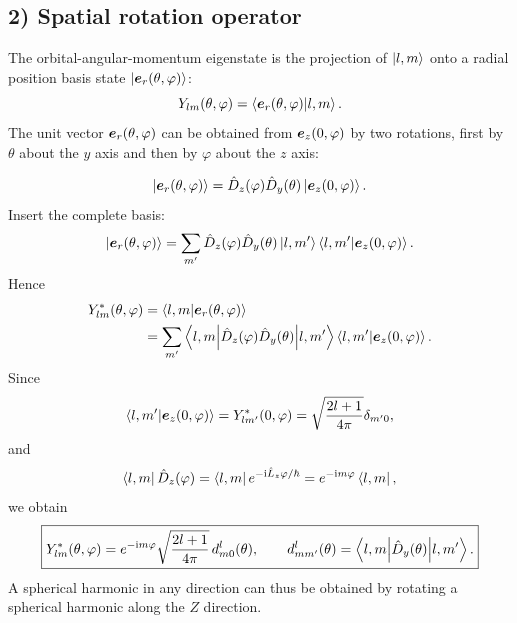 \subsection*{2) Spatial rotation operator}
The orbital-angular-momentum eigenstate is the projection of $\left|l,m\right\rangle$ onto a radial position basis state $\left|\bm{e}_r(\theta,\varphi)\right\rangle$:
\begin{equation}
Y_{lm}(\theta,\varphi)=\left\langle\bm{e}_r(\theta,\varphi)\middle|l,m\right\rangle.
\end{equation}
The unit vector $\bm{e}_r(\theta,\varphi)$ can be obtained from $\bm{e}_z(0,\varphi)$ by two rotations, first by $\theta$ about the $y$ axis and then by $\varphi$ about the $z$ axis:

\begin{equation}
\left|\bm{e}_r(\theta,\varphi)\right\rangle
=\hat{D}_z(\varphi)\hat{D}_y(\theta)\left|\bm{e}_z(0,\varphi)\right\rangle.
\end{equation}
Insert the complete basis:
\begin{equation}
\left|\bm{e}_r(\theta,\varphi)\right\rangle
=\sum_{m'}\hat{D}_z(\varphi)\hat{D}_y(\theta)\left|l,m'\right\rangle
\left\langle l,m'\middle|\bm{e}_z(0,\varphi)\right\rangle.
\end{equation}
Hence
\begin{equation}\begin{aligned}
Y_{lm}^*(\theta,\varphi)
&=\left\langle l,m\middle|\bm{e}_r(\theta,\varphi)\right\rangle\\
&=\sum_{m'}\left\langle l,m\middle|\hat{D}_z(\varphi)\hat{D}_y(\theta)\middle|l,m'\right\rangle
\left\langle l,m'\middle|\bm{e}_z(0,\varphi)\right\rangle.
\end{aligned}\end{equation}
Since
\begin{equation}
\left\langle l,m'\middle|\bm{e}_z(0,\varphi)\right\rangle=Y_{lm'}^*(0,\varphi)
=\sqrt{\frac{2l+1}{4\pi}}\delta_{m'0},
\end{equation}
and
\begin{equation}
\left\langle l,m\right|\hat{D}_z(\varphi)
=\left\langle l,m\right|e^{-\mathrm{i}\hat{L}_z\varphi/\hbar}
=e^{-\mathrm{i} m\varphi}\left\langle l,m\right|,
\end{equation}
we obtain
\begin{equation}
\boxed{Y_{lm}^*(\theta,\varphi)
=e^{-\mathrm{i} m\varphi}\sqrt{\frac{2l+1}{4\pi}}\,d^l_{m0}(\theta),\qquad
 d^l_{mm'}(\theta)=\left\langle l,m\middle|\hat{D}_y(\theta)\middle|l,m'\right\rangle.}
\end{equation}
A spherical harmonic in any direction can thus be obtained by rotating a spherical harmonic along the $Z$ direction.